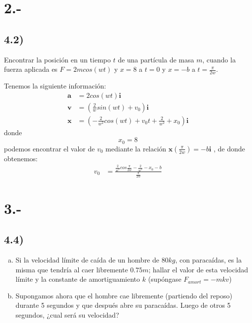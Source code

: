 \documentclass{article}
\begin{document}
\section*{2.-}
\subsection*{4.2)}
Encontrar la posición en un tiempo $t$ de una partícula de masa $m$, cuando la fuerza aplicada
es $F=2mcos(wt)$ y $x=8$ a $t=0$ y $x=-b$ a $t=\frac{\pi}{2w}$.
\begin{tcolorbox}[breakable]
    Tenemos la siguiente información:
    \begin{align*}
        \bm{a} &= 2cos(wt) \bm{i} \\
        \bm{v} &= \left(\frac{2}{w}sin(wt) + v_0 \right)\bm{i} \\ 
        \bm{x} &= \left(-\frac{2}{w^2}cos(wt) + v_0t + \frac{2}{w^2} + x_0 \right) \bm{i}
    \end{align*}
    donde 
    \[x_0 = 8 \]
    podemos encontrar el valor de $v_0$ mediante la relación $\bm{x}(\frac{\pi}{2w}) = -b\bm{i}$
    , de donde obtenemos:
    \begin{align*}
        v_0 &= \frac{\frac{2}{w^2}cos\frac{\pi}{2w} - \frac{2}{w^2} - x_0 - b}{\frac{\pi}{2w}}
    \end{align*}
\end{tcolorbox}

\section*{3.-}
\subsection*{4.4)}
\begin{enumerate}[a)]
    \item Si la velocidad límite de caída de un hombre de $80kg$, con paracaídas, es 
    la misma que tendría al caer libremente $0.75m$; hallar el valor de esta velocidad 
    límite y la constante de amortiguamiento $k$ (supóngase $F_{amort} = -mkv$)
    \item Supongamos ahora que el hombre cae libremente (partiendo del reposo) durante 
    5 segundos y que después abre su paracaídas. Luego de otros 5 segundos, ¿cual será su 
    velocidad? 
\end{enumerate}
\begin{tcolorbox}[breakable]
    
\end{tcolorbox}
\end{document}
